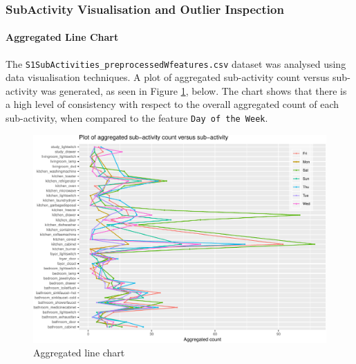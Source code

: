 \documentclass[11pt,]{article}
\let\oldparagraph\paragraph
\renewcommand{\paragraph}[1]{\oldparagraph{#1}\mbox{}}
\begin{document}

\pagebreak

\hypertarget{subactivity-visualisation-and-outlier-inspection}{%
\subsubsection{SubActivity Visualisation and Outlier
Inspection}\label{subactivity-visualisation-and-outlier-inspection}}

\hypertarget{aggregated-line-chart}{%
\paragraph{Aggregated Line Chart}\label{aggregated-line-chart}}

The \texttt{S1SubActivities\_preprocessedWfeatures.csv} dataset was
analysed using data visualisation techniques. A plot of aggregated
sub-activity count versus sub-activity was generated, as seen in Figure
\ref{fig:FIG_aggLineChart}, below. The chart shows that there is a high
level of consistency with respect to the overall aggregated count of
each sub-activity, when compared to the feature
\texttt{Day\ of\ the\ Week}.

\begin{figure}[H]

{\centering \includegraphics{MD_Final_files/figure-latex/FIG_aggLineChart-1} 

}

\caption{Aggregated line chart}\label{fig:FIG_aggLineChart}
\end{figure}

\pagebreak
\end{document}

